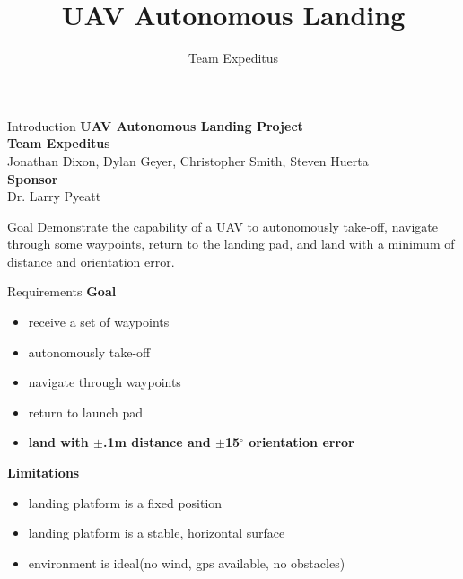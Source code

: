 \documentclass[11pt]{beamer}
\author{Team Expeditus}
\title{UAV Autonomous Landing}
\institute{SDSMT MCS}
\begin{document}
\begin{frame}
\titlepage
\end{frame}


\begin{frame}{Introduction}
\textbf{UAV Autonomous Landing Project}\\
\vspace{12mm}
\textbf{Team Expeditus}\\
Jonathan Dixon, Dylan Geyer, Christopher Smith, Steven Huerta\\ 
\vspace{6mm}
\textbf{Sponsor}\\
Dr. Larry Pyeatt\\
\end{frame}


\begin{frame}{Goal}
Demonstrate the capability of a UAV to autonomously take-off, navigate through some waypoints, return to the landing pad, and land with a minimum of distance and orientation error. 
\end{frame}


\begin{frame}{Requirements}
\textbf{Goal}\\
\begin{itemize}
\item receive a set of waypoints
\item autonomously take-off
\item navigate through waypoints
\item return to launch pad
\item \textbf{land with $\pm$.1m distance and $\pm$15$^{\circ}$ orientation error}
\end{itemize}
\vspace{6mm}
\textbf{Limitations}\\
\begin{itemize}
\item landing platform is a fixed position
\item landing platform is a stable, horizontal surface
\item environment is ideal(no wind, gps available, no obstacles)
\end{itemize}
\end{frame}
\end{document}
